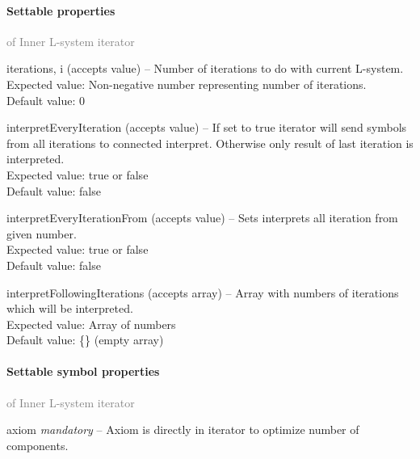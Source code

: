 	\paragraph{Settable properties}\textcolor{gray}{of Inner L-system iterator}
	\begin{description*}
		\item[iterations, i]
		(accepts value)
			-- Number of iterations to do with current L-system.
			\\ Expected value: Non-negative number representing number of iterations.
			\\ Default value: 0
		\item[interpretEveryIteration]
		(accepts value)
			-- If set to true iterator will send symbols from all iterations to connected interpret.
            Otherwise only result of last iteration is interpreted.
			\\ Expected value: true or false
			\\ Default value: false
		\item[interpretEveryIterationFrom]
		(accepts value)
			-- Sets interprets all iteration from given number.
			\\ Expected value: true or false
			\\ Default value: false
		\item[interpretFollowingIterations]
		(accepts array)
			-- Array with numbers of iterations which will be interpreted.
			\\ Expected value: Array of numbers
			\\ Default value: \{\} (empty array)
	\end{description*}
	\paragraph{Settable symbol properties}\textcolor{gray}{of Inner L-system iterator}
	\begin{description*}
		\item[axiom]
 \textit{mandatory} 			-- Axiom is directly in iterator to optimize number of components.
	\end{description*}

